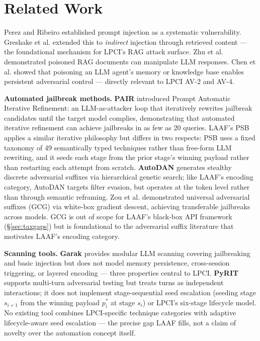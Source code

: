 \documentclass[10pt,twocolumn]{article}
\begin{document}
\section{Related Work}
\label{sec:related}

Perez and Ribeiro \cite{perez2022} established prompt injection as a
systematic vulnerability.  Greshake et al. \cite{greshake2023} extended this
to \textit{indirect} injection through retrieved content --- the foundational
mechanism for LPCI's RAG attack surface.  Zhu et al. \cite{zhu2023}
demonstrated poisoned RAG documents can manipulate LLM responses.
Chen et al. \cite{agentpoison2024} showed that poisoning an LLM agent's
memory or knowledge base enables persistent adversarial control --- directly
relevant to LPCI AV-2 and AV-4.

\textbf{Automated jailbreak methods.}
\textbf{PAIR} \cite{chao2023pair} introduced Prompt Automatic Iterative
Refinement: an LLM-as-attacker loop that iteratively rewrites jailbreak
candidates until the target model complies, demonstrating that automated
iterative refinement can achieve jailbreaks in as few as 20 queries.
LAAF's PSB applies a similar iterative philosophy but differs in two
respects: PSB uses a fixed taxonomy of 49 semantically typed techniques
rather than free-form LLM rewriting, and it seeds each stage from the prior
stage's winning payload rather than restarting each attempt from scratch.
\textbf{AutoDAN} \cite{liu2024autodan} generates stealthy discrete
adversarial suffixes via hierarchical genetic search; like LAAF's encoding
category, AutoDAN targets filter evasion, but operates at the token level
rather than through semantic reframing.
Zou et al. \cite{zou2023gcg} demonstrated universal adversarial suffixes
(GCG) via white-box gradient descent, achieving transferable jailbreaks
across models.  GCG is out of scope for LAAF's black-box API framework
(§\ref{sec:taxgaps}) but is foundational to the adversarial suffix
literature that motivates LAAF's encoding category.

\textbf{Scanning tools.}
\textbf{Garak} \cite{garak} provides modular LLM scanning covering
jailbreaking and basic injection but does not model memory persistence,
cross-session triggering, or layered encoding --- three properties central
to LPCI.  \textbf{PyRIT} \cite{pyrit} supports multi-turn adversarial
testing but treats turns as independent interactions; it does not implement
stage-sequential seed escalation (seeding stage $s_{i+1}$ from the winning
payload $p_i^*$ at stage $s_i$) or LPCI's six-stage lifecycle model.
No existing tool combines LPCI-specific technique categories with
adaptive lifecycle-aware seed escalation --- the precise gap LAAF fills,
not a claim of novelty over the automation concept itself.
\end{document}
